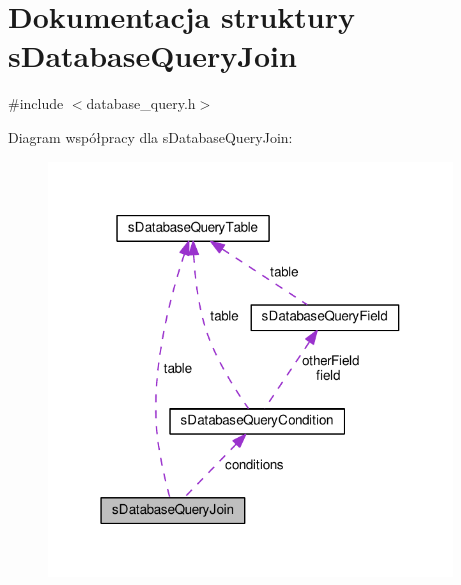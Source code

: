 \hypertarget{structsDatabaseQueryJoin}{}\section{Dokumentacja struktury s\+Database\+Query\+Join}
\label{structsDatabaseQueryJoin}


{\ttfamily \#include $<$database\+\_\+query.\+h$>$}



Diagram współpracy dla s\+Database\+Query\+Join\+:\nopagebreak
\begin{figure}[H]
\begin{center}
\leavevmode
\includegraphics[width=304pt]{structsDatabaseQueryJoin__coll__graph}
\end{center}
\end{figure}
